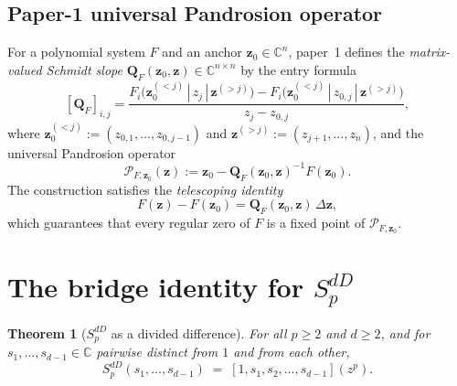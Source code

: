 \documentclass[11pt,a4paper]{article}
\newtheorem{theorem}{Theorem}[section]
\theoremstyle{definition}
\theoremstyle{remark}
\newcommand{\C}{\mathbb{C}}
\newcommand{\zb}{\mathbf{z}}
\newcommand{\Qb}{\mathbf{Q}}
\begin{document}
\subsection{Paper-1 universal Pandrosion operator}

For a polynomial system $F$ and an anchor $\zb_0 \in \C^n$, paper~1
\cite[\S3.5]{pandrosion-smale} defines the \emph{matrix-valued Schmidt slope}
$\Qb_F(\zb_0, \zb) \in \C^{n \times n}$ by the entry formula
\begin{equation}\label{eq:Q-paper1}
[\Qb_F]_{i,j} = \frac{F_i\big(\zb_0^{(<j)} \,|\, z_j \,|\, \zb^{(>j)}\big)
                       - F_i\big(\zb_0^{(<j)} \,|\, z_{0,j} \,|\, \zb^{(>j)}\big)}{z_j - z_{0,j}},
\end{equation}
where $\zb_0^{(<j)} := (z_{0,1}, \dots, z_{0,j-1})$ and
$\zb^{(>j)} := (z_{j+1}, \dots, z_n)$, and the universal Pandrosion operator
\begin{equation}\label{eq:P-paper1}
\mathcal{P}_{F, \zb_0}(\zb) := \zb_0 - \Qb_F(\zb_0, \zb)^{-1} F(\zb_0).
\end{equation}
The construction satisfies the \emph{telescoping identity}
\begin{equation}\label{eq:telescope-paper1}
F(\zb) - F(\zb_0) = \Qb_F(\zb_0, \zb)\, \Delta\zb,
\end{equation}
which guarantees that every regular zero of $F$ is a fixed point of
$\mathcal{P}_{F, \zb_0}$.

\section{The bridge identity for $S_p^{dD}$}

\begin{theorem}[$S_p^{dD}$ as a divided difference]\label{thm:bridge-identity}
For all $p \ge 2$ and $d \ge 2$, and for $s_1, \dots, s_{d-1} \in \C$
pairwise distinct from $1$ and from each other,
\begin{equation}\label{eq:bridge-identity}
S_p^{dD}(s_1, \dots, s_{d-1})
\;=\;
[1, s_1, s_2, \dots, s_{d-1}](z^p).
\end{equation}
\end{theorem}
\end{document}

